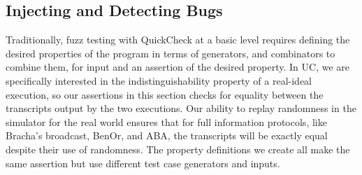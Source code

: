 \subsection{Injecting and Detecting Bugs}
Traditionally, fuzz testing with QuickCheck at a basic level requires defining the desired properties of the program in terms of generators, and combinators to combine them, for input and an assertion of the desired property.
In UC, we are specifically interested in the indistinguishability property of a real-ideal execution, so our assertions in this section checks for equality between the transcripts output by the two executions.
Our ability to replay randomness in the simulator for the real world ensures that for full information protocols, like Bracha's broadcast, BenOr, and ABA, the transcripts will be exactly equal despite their use of randomness.
The property definitions we create all make the same assertion but use different test case generators and inputs. 

